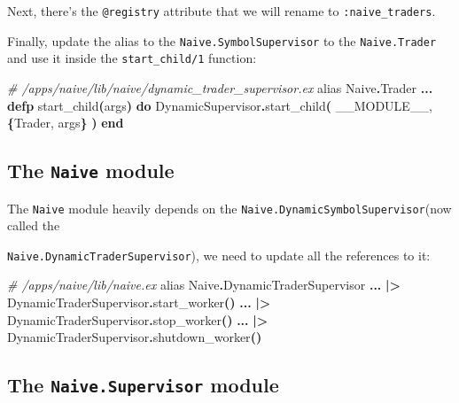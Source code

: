 \documentclass[
  oneside]{book}
\newenvironment{Shaded}{\begin{snugshade}}{\end{snugshade}}
\newcommand{\CommentTok}[1]{\textcolor[rgb]{0.56,0.35,0.01}{\textit{#1}}}
\newcommand{\ConstantTok}[1]{\textcolor[rgb]{0.56,0.35,0.01}{#1}}
\newcommand{\FunctionTok}[1]{\textcolor[rgb]{0.13,0.29,0.53}{\textbf{#1}}}
\newcommand{\ImportTok}[1]{#1}
\newcommand{\KeywordTok}[1]{\textcolor[rgb]{0.13,0.29,0.53}{\textbf{#1}}}
\newcommand{\NormalTok}[1]{#1}
\newcommand{\OperatorTok}[1]{\textcolor[rgb]{0.81,0.36,0.00}{\textbf{#1}}}
\begin{document}
Next, there's the \texttt{@registry} attribute that we will rename to \texttt{:naive\_traders}.

Finally, update the alias to the \texttt{Naive.SymbolSupervisor} to the \texttt{Naive.Trader} and use it inside the \texttt{start\_child/1} function:

\begin{Shaded}
\begin{Highlighting}[]
  \CommentTok{\# /apps/naive/lib/naive/dynamic\_trader\_supervisor.ex}
  \ImportTok{alias} \ConstantTok{Naive}\OperatorTok{.}\ConstantTok{Trader} 
  \OperatorTok{...}
  \KeywordTok{defp}\NormalTok{ start\_child}\FunctionTok{(}\NormalTok{args}\FunctionTok{)} \KeywordTok{do}
    \ConstantTok{DynamicSupervisor}\OperatorTok{.}\NormalTok{start\_child}\FunctionTok{(}
      \ConstantTok{\_\_MODULE\_\_}\NormalTok{,}
      \FunctionTok{\{}\ConstantTok{Trader}\NormalTok{, args}\FunctionTok{\}}
    \FunctionTok{)}
  \KeywordTok{end}
\end{Highlighting}
\end{Shaded}

\subsection{\texorpdfstring{The \texttt{Naive} module}{The Naive module}}\label{the-naive-module}

The \texttt{Naive} module heavily depends on the \texttt{Naive.DynamicSymbolSupervisor}(now called the

\texttt{Naive.DynamicTraderSupervisor}), we need to update all the references to it:

\begin{Shaded}
\begin{Highlighting}[]
  \CommentTok{\# /apps/naive/lib/naive.ex}
  \ImportTok{alias} \ConstantTok{Naive}\OperatorTok{.}\ConstantTok{DynamicTraderSupervisor}
  \OperatorTok{...}
  \OperatorTok{|\textgreater{}} \ConstantTok{DynamicTraderSupervisor}\OperatorTok{.}\NormalTok{start\_worker}\FunctionTok{()}
  \OperatorTok{...}
  \OperatorTok{|\textgreater{}} \ConstantTok{DynamicTraderSupervisor}\OperatorTok{.}\NormalTok{stop\_worker}\FunctionTok{()}
  \OperatorTok{...}
  \OperatorTok{|\textgreater{}} \ConstantTok{DynamicTraderSupervisor}\OperatorTok{.}\NormalTok{shutdown\_worker}\FunctionTok{()}
\end{Highlighting}
\end{Shaded}

\subsection{\texorpdfstring{The \texttt{Naive.Supervisor} module}{The Naive.Supervisor module}}\label{the-naive.supervisor-module}
\end{document}
